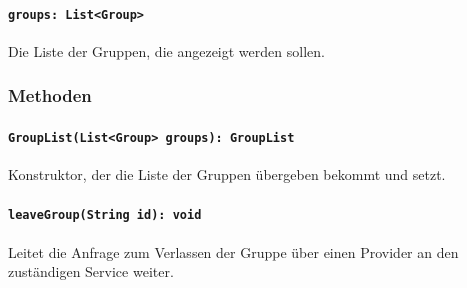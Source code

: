 \documentclass{entwurfsheft}
\begin{document}
\paragraph{\texttt{groups: List<Group>}}
Die Liste der Gruppen, die angezeigt werden sollen.
\subsubsection*{Methoden}
\paragraph{\texttt{GroupList(List<Group> groups): GroupList}}
Konstruktor, der die Liste der Gruppen übergeben bekommt und setzt.
\paragraph{\texttt{leaveGroup(String id): void}}
Leitet die Anfrage zum Verlassen der Gruppe über einen Provider an den zuständigen Service weiter.
\newpage
\end{document}
